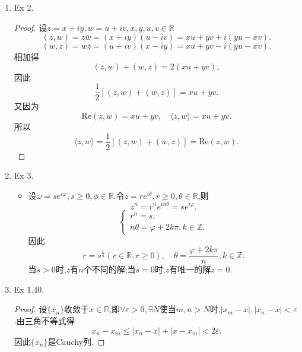 \documentclass[12pt, a4paper]{article}
\begin{document}
\begin{enumerate}
    \item Ex 2. \label{ex:2}
    \begin{proof}
        设\(z = x + iy, w = u + iv, x, y, u, v \in \mathbb{R}\)
        \[(z, w) = z\bar{w} = (x + iy)(u - iv) = xu + yv + i(yu - xv).\]
        \[(w, z) = w\bar{z} = (u + iv)(x - iy) = xu + yv - i(yu - xv).\]
        相加得
        \[(z, w) + (w, z) = 2(xu + yv),\]
        因此
        \[\frac{1}{2}[(z, w) + (w, z)] = xu + yv.\]
        又因为
        \[\mathrm{Re}(z, w) = xu + yv, \quad \langle z, w \rangle = xu + yv.\]
        所以
        \[\langle z, w \rangle = \frac{1}{2}[(z, w) + (w, z)] = \mathrm{Re}(z, w).\]
    \end{proof}
    \item Ex 3. \label{ex:3}
    \begin{itemize}
        \item[解] 设\(\omega = se^{i\varphi}, s \geq 0, \phi \in \mathbb{R}\).令\(z = re^{i\theta}, r \geq 0, \theta \in \mathbb{R}\),则
        \[z^n = r^ne^{in\theta} = se^{i\varphi}.\]
        \[\begin{cases}
            r^n = s, \\
            n\theta = \varphi + 2k\pi, k \in \mathbb{Z}.
        \end{cases}\]
        因此
        \[r = s^{\frac{1}{n}} (r \in \mathbb{R}, r \geq 0), \quad \theta = \frac{\varphi + 2k\pi}{n}, k \in \mathbb{Z}.\]
        当\(s > 0\)时,\(z\)有\(n\)个不同的解;当\(s = 0\)时,\(z\)有唯一的解\(z = 0\).
    \end{itemize}
    \item Ex 1.40. \label{ex:1.40}
    \begin{proof}
        设\(\{x_n\}\)收敛于\(x \in \mathbb{R}\),即\(\forall \varepsilon > 0, \exists N\)使当\(m, n > N\)时,\(|x_m - x|, |x_n - x| < \varepsilon\).由三角不等式得
        \[x_n - x_m \leq |x_n - x| + |x - x_m| < 2\varepsilon.\]
        因此\(\{x_n\}\)是Cauchy列.


\end{proof}
\end{enumerate}
\end{document}
